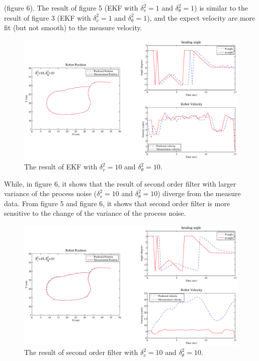 \documentclass{article}
\begin{document}
 (figure 6). The result of figure 5 (EKF with $\delta_v^2=1$ and $\delta_\theta^2=1$) is similar to the result of figure 
 3 (EKF with $\delta_v^2=1$ and $\delta_\theta^2=1$), and the expect velocity are more fit (but not smooth) to 
 the measure velocity. 
  \begin{figure}[H]
	 \begin{center}
	 	\includegraphics[width=\textwidth]{EKF_v10_w10.eps}
	 	\caption{The result of EKF with $\delta_v^2=10$ and $\delta_\theta^2=10$.}
	 \end{center}
 \end{figure}
 While, in figure 6, it shows that the result of second order filter with larger variance of the process noise ($\delta_v^2=10$ 
 and $\delta_\theta^2=10$) diverge from the measure data. From figure 5 and figure 6, it shows that second order filter 
 is more sensitive to the change of the variance of the process noise. 
 \begin{figure}[H]
	 \begin{center}
	 	\includegraphics[width=\textwidth]{sof_v10_w10.eps}
	 	\caption{The result of second order filter with $\delta_v^2=10$ and $\delta_\theta^2=10$.}
	 \end{center}
 \end{figure}
\end{document}
